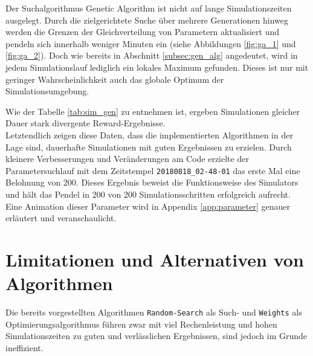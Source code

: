 	Der Suchalgorithmus Genetic Algorithm ist nicht auf lange Simulationszeiten ausgelegt. Durch die zielgerichtete Suche über mehrere Generationen hinweg werden die Grenzen der Gleichverteilung von Parametern aktualisiert und pendeln sich innerhalb weniger Minuten ein (siehe Abbildungen \ref{fig:ga_1} und \ref{fig:ga_2}). Doch wie bereits in Abschnitt \ref{subsec:gen_alg} angedeutet, wird in jedem Simulationslauf lediglich ein lokales Maximum gefunden. Dieses ist nur mit geringer Wahrscheinlichkeit auch das globale Optimum der Simulationsumgebung.
	\begin{table}[H]
		\centering
		\caption{Optimierung durch Algorithmus \texttt{Genetic\_Algorithm}.}
		\label{tab:sim_gen}
	\end{table}
	Wie der Tabelle \ref{tab:sim_gen} zu entnehmen ist, ergeben Simulationen gleicher Dauer stark divergente Reward-Ergebnisse.\\
	Letztendlich zeigen diese Daten, dass die implementierten Algorithmen in der Lage sind, dauerhafte Simulationen mit guten Ergebnissen zu erzielen. Durch kleinere Verbesserungen und Veränderungen am Code erzielte der Parametersuchlauf mit dem Zeitstempel \texttt{20180818\_02-48-01} das erste Mal eine Belohnung von 200. Dieses Ergebnis beweist die Funktionsweise des Simulators und hält das Pendel in 200 von 200 Simulationsschritten erfolgreich aufrecht. Eine Animation dieser Parameter wird in Appendix \ref{app:parameter} genauer erläutert und veranschaulicht.
	
\section{Limitationen und Alternativen von Algorithmen}
\label{sec:erg_lim}
	Die bereits vorgestellten Algorithmen \texttt{Random-Search} als Such- und \texttt{Weights} als Optimierungsalgorithmus führen zwar mit viel Rechenleistung und hohen Simulationszeiten zu guten und verlässlichen Ergebnissen, sind jedoch im Grunde ineffizient.\\
